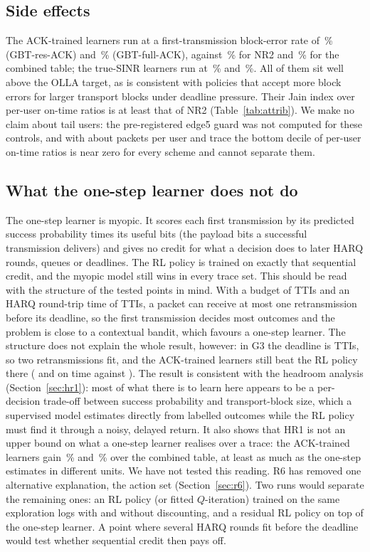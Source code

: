 \subsection{Side effects}
The ACK-trained learners run at a first-transmission block-error rate of \NPSBlerGbtResAck\,\% (GBT-res-ACK) and \NPSBlerGbtFullAck\,\% (GBT-full-ACK), against \NPSBlerNRtwo\,\% for NR2 and \NPSBlerCtxJ\,\% for the combined table; the true-SINR learners run at \NPSBlerGbtRes\,\% and \NPSBlerGbtFull\,\%. All of them sit well above the OLLA target, as is consistent with policies that accept more block errors for larger transport blocks under deadline pressure. Their Jain index over per-user on-time ratios is at least that of NR2 (Table~\ref{tab:attrib}). We make no claim about tail users: the pre-registered edge5 guard was not computed for these controls, and with about \NPSPktUser{} packets per user and trace the bottom decile of per-user on-time ratios is near zero for every scheme and cannot separate them.

\subsection{What the one-step learner does not do}\label{sec:myopic}
The one-step learner is myopic. It scores each first transmission by its predicted success probability times its useful bits (the payload bits a successful transmission delivers) and gives no credit for what a decision does to later HARQ rounds, queues or deadlines. The RL policy is trained on exactly that sequential credit, and the myopic model still wins in every trace set. This should be read with the structure of the tested points in mind. With a budget of \NCfgDeadline{} TTIs and an HARQ round-trip time of \NCfgRtt{} TTIs, a packet can receive at most one retransmission before its deadline, so the first transmission decides most outcomes and the problem is close to a contextual bandit, which favours a one-step learner. The structure does not explain the whole result, however: in G3 the deadline is \NGthreeDeadline{} TTIs, so two retransmissions fit, and the ACK-trained learners still beat the RL policy there ( and  on time against ). The result is consistent with the headroom analysis (Section~\ref{sec:hr1}): most of what there is to learn here appears to be a per-decision trade-off between success probability and transport-block size, which a supervised model estimates directly from labelled outcomes while the RL policy must find it through a noisy, delayed return. It also shows that HR1 is not an upper bound on what a one-step learner realises over a trace: the ACK-trained learners gain \NPSGbtResAckOverCtxJ\,\% and \NPSGbtFullAckOverCtxJ\,\% over the combined table, at least as much as the one-step estimates in different units. We have not tested this reading. R6 has removed one alternative explanation, the action set (Section~\ref{sec:r6}). Two runs would separate the remaining ones: an RL policy (or fitted $Q$-iteration) trained on the same exploration logs with and without discounting, and a residual RL policy on top of the one-step learner. A point where several HARQ rounds fit before the deadline would test whether sequential credit then pays off.
